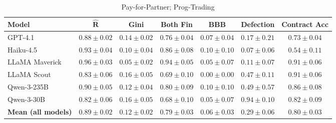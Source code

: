 \documentclass{article} %
\newcommand{\PTC}{Prog-Trading\xspace}
\newcommand{\GPT}{GPT-4.1\xspace}
\newcommand{\Haiku}{Haiku-4.5\xspace}
\newcommand{\Maverick}{LLaMA Maverick\xspace}
\newcommand{\Scout}{LLaMA Scout\xspace}
\newcommand{\Qttf}{Qwen-3-235B\xspace}
\newcommand{\Qthirty}{Qwen-3-30B\xspace}
\newcommand{\PforP}{Pay-for-Partner\xspace}
\begin{document}
%
\begin{table}[t]
\centering
\begin{small}
\begin{tabular}{lcccccc}
\toprule
\textbf{Model}
& \textbf{$\mathbf{\hat{R}}$}
& \textbf{Gini}
& \textbf{Both Fin}
& \textbf{BBB}
& \textbf{Defection}
& \textbf{Contract Acc}
\\
\midrule
%
\GPT
& $0.88 \pm 0.02$
& $0.14 \pm 0.02$
& $0.76 \pm 0.04$
& $0.07 \pm 0.04$
& $0.17 \pm 0.21$
& $0.73 \pm 0.04$
\\

\Haiku
& $0.93 \pm 0.04$
& $0.10 \pm 0.04$
& $0.86 \pm 0.08$
& $0.10 \pm 0.10$
& $0.07 \pm 0.06$
& $0.54 \pm 0.11$
\\

\Maverick
& $0.96 \pm 0.03$
& $0.05 \pm 0.02$
& $0.94 \pm 0.05$
& $0.05 \pm 0.07$
& $0.11 \pm 0.07$
& $0.91 \pm 0.06$
\\

\Scout
& $0.83 \pm 0.06$
& $0.16 \pm 0.05$
& $0.69 \pm 0.10$
& $0.00 \pm 0.00$
& $0.47 \pm 0.11$
& $0.91 \pm 0.06$
\\

\Qttf
& $0.90 \pm 0.05$
& $0.12 \pm 0.04$
& $0.80 \pm 0.09$
& $0.10 \pm 0.10$
& $0.49 \pm 0.57$
& $0.86 \pm 0.08$
\\

\Qthirty
& $0.82 \pm 0.06$
& $0.16 \pm 0.05$
& $0.68 \pm 0.10$
& $0.05 \pm 0.07$
& $0.94 \pm 0.10$
& $0.82 \pm 0.09$
\\

\midrule
%
\textbf{Mean (all models)}
& $\mathbf{0.89 \pm 0.02}$
& $\mathbf{0.12 \pm 0.02}$
& $\mathbf{0.79 \pm 0.03}$
& $\mathbf{0.06 \pm 0.03}$
& $\mathbf{0.29 \pm 0.06}$
& $\mathbf{0.80 \pm 0.03}$
\\
\bottomrule
\end{tabular}
\end{small}
\caption{\PforP; \PTC}
\label{tab:}
\end{table}
\end{document}
